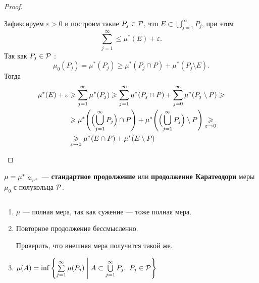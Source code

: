 \begin{proof}
\begin{description}
			Зафиксируем $ \varepsilon >0$ и построим такие $ P_j \in \P$, что $ E \subset \bigcup\limits_{j=1}^{\infty} P_j$, при этом
			\[
			\sum_{j=1}^{\infty} \le \mu^*( E )+\varepsilon 
			.\] 
			Так как $ P_j \in \P$ :
			\[
				\mu_0(P_j) = \mu^*( P_j ) \ge \mu^*( P_j \cap P ) + \mu^*( P_j \setminus E )
			.\] 
			Тогда
			\[
			\begin{aligned}
				\mu^*( E )  + \varepsilon  &\ge  \sum_{j=1}^{\infty} \mu^*( P_j )  \ge \sum_{j=1}^{\infty} \mu^*( P_j \cap P )  + \sum_{j=0}^{\infty} \mu^*( P_j \setminus P )  \ge \\
										   & \ge \mu^*\Biggl( \Bigl(\bigcup_{j=1}^{\infty} P_j \Bigr) \cap P\Biggr) + \mu^*\Biggl( \Bigl(  \bigcup_{j=1}^{\infty} P_j\Bigr)\setminus P\Biggr) \underset{\varepsilon  \to  0}{\ge} \\
										   &\underset{\varepsilon \to  0}{\ge} \mu^*( E \cap P ) + \mu^*( E \setminus P )
			\end{aligned}
			\]
	\end{description} 
\end{proof}
\begin{defn}
	$ \mu = \mu^{*}\!\mid_{\A_{\mu^{*}}}$ --- {\bf стандартное продолжение}  или {\bf продолжение Каратеодори} меры $ \mu_0$ с полукольца $ \P$. 
\end{defn}

\begin{note}
    $ $
	\begin{enumerate}
	    \item $ \mu$ --- полная мера, так как сужение --- тоже полная мера.
		\item Повторное продолжение бессмысленно. 
			\begin{prac}
			    Проверить, что внешняя мера получится такой же.
			\end{prac}
		\item $ \mu (A) = \inf \left\{ \sum\limits_{j=1}^{\infty} \mu  (P_j) \Biggm| A \subset \bigcup\limits_{j=1}^{\infty} P_j, ~P_j \in \P \right\} $
	\end{enumerate} 
\end{note}


